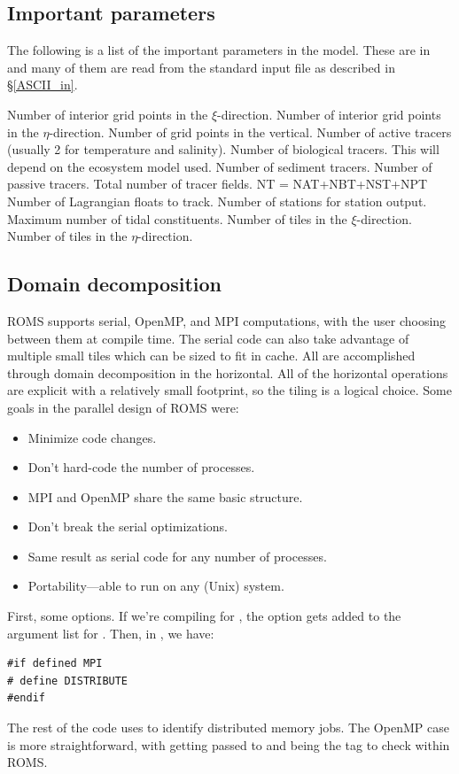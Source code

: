 \subsection{Important parameters}
\label{Parms}
The following is a list of the important parameters in the model. These
are in  and many of them are read from the standard
input file as described in \S\ref{ASCII_in}.
\begin{klist}
   Number of interior grid points in the $\xi$-direction.
   Number of interior grid points in the $\eta$-direction.
   Number of grid points in the vertical.
   Number of active tracers (usually 2 for temperature and
    salinity).
   Number of biological tracers. This will depend on the
    ecosystem model used.
   Number of sediment tracers.
   Number of passive tracers.
   Total number of tracer fields. NT = NAT+NBT+NST+NPT
   Number of Lagrangian floats to track.
   Number of stations for station output.
   Maximum number of tidal constituents.
   Number of tiles in the $\xi$-direction.
   Number of tiles in the $\eta$-direction.
\end{klist}

\subsection{Domain decomposition}
\label{Tiles}

ROMS supports serial, OpenMP, and MPI computations, with the user
choosing between them at compile time. The serial code can also take
advantage of multiple small
tiles which can be sized to fit in cache. All are accomplished
through domain decomposition in the horizontal. All of the
horizontal operations are explicit with a relatively small
footprint, so the tiling is a logical choice. Some goals in the
parallel design of ROMS were:
\begin{itemize}
  \item Minimize code changes.
  \item Don't hard-code the number of processes.
  \item MPI and OpenMP share the same basic structure.
  \item Don't break the serial optimizations.
  \item Same result as serial code for any number of processes.
  \item Portability---able to run on any (Unix) system.
\end{itemize}
First, some  options. If we're compiling for ,
the option  gets added to the argument list for
. Then, in , we have:
\begin{verbatim}
#if defined MPI
# define DISTRIBUTE
#endif
\end{verbatim}
The rest of the code uses  to identify distributed
memory jobs. The OpenMP case is more straightforward, with
 getting passed to  and 
being the tag to check within ROMS.

